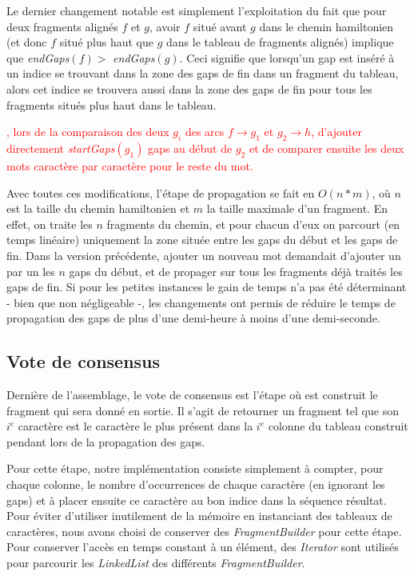 \documentclass{article}
\begin{document}
Le dernier changement notable est simplement l'exploitation du fait que pour deux fragments alignés $f$ et $g$, avoir $f$ situé avant $g$ dans le chemin hamiltonien (et donc $f$ situé plus haut que $g$ dans le tableau de fragments alignés) implique que \textit{endGaps}$(f) > $  \textit{endGaps}$(g)$. Ceci signifie que lorsqu'un gap est inséré à un indice se trouvant dans la zone des gaps de fin dans un fragment du tableau, alors cet indice se trouvera aussi dans la zone des gaps de fin pour tous les fragments situés plus haut dans le tableau. 


\textcolor{red}{, lors de la comparaison des deux $g_i$ des arcs $f \to g_1$ et $ g_2 \to h$, d'ajouter directement \textit{startGaps}$(g_1)$ gaps au début de $g_2$ et de comparer ensuite les deux mots caractère par caractère pour le reste du mot.}

Avec toutes ces modifications, l'étape de propagation se fait en $O(n*m)$, où $n$ est la taille du chemin hamiltonien et $m$ la taille maximale d'un fragment. En effet, on traite les $n$ fragments du chemin, et pour chacun d'eux on parcourt (en temps linéaire) uniquement la zone située entre les gaps du début et les gaps de fin. Dans la version précédente, ajouter un nouveau mot demandait d'ajouter un par un les $n$ gaps du début, et de propager sur tous les fragments déjà traités les gaps de fin. Si pour les petites instances le gain de temps n'a pas été déterminant - bien que non négligeable -, les changements ont permis de réduire le temps de propagation des gaps de plus d'une demi-heure à moins d'une demi-seconde.


\subsection{Vote de consensus}

Dernière de l'assemblage, le vote de consensus est l'étape où est construit le fragment qui sera donné en sortie. Il s'agit de retourner un fragment tel que son $i^e$ caractère est le caractère le plus présent dans la $i^e$ colonne du tableau construit pendant lors de la propagation des gaps.

Pour cette étape, notre implémentation consiste simplement à compter, pour chaque colonne, le nombre d’occurrences de chaque caractère (en ignorant les gaps) et à placer ensuite ce caractère au bon indice dans la séquence résultat.
Pour éviter d'utiliser inutilement de la mémoire en instanciant des tableaux de caractères, nous avons choisi de conserver des \textit{FragmentBuilder} pour cette étape. Pour conserver l'accès en temps constant à un élément, des \textit{Iterator} sont utilisés pour parcourir les \textit{LinkedList} des différents \textit{FragmentBuilder}.
\end{document}

